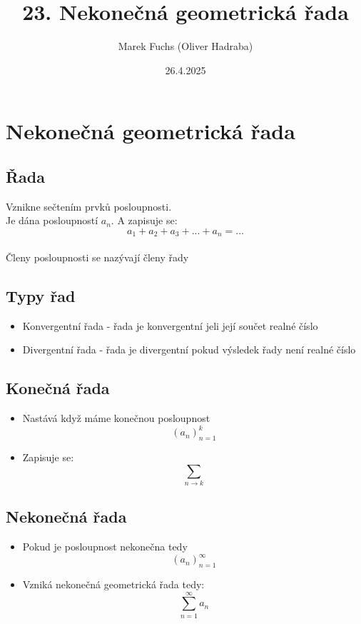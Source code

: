 \title{ 23. Nekonečná geometrická řada}
\author{Marek Fuchs (Oliver Hadraba)}
\date{26.4.2025}

\maketitle



\section{Nekonečná geometrická řada}
    \subsection{Řada}
    Vznikne sečtením prvků posloupnosti.\\
    Je dána posloupností $a_n$. A zapisuje se:
    $$
    a_1+a_2+a_3+...+a_n=...
    $$\\
    Členy posloupnosti se nazývají členy řady
    \subsection{Typy řad}
    \begin{itemize}
        \item Konvergentní řada - řada je konvergentní jeli její součet realné číslo
        \item Divergentní řada - řada je divergentní pokud výsledek řady není realné číslo
    \end{itemize}
    \subsection{Konečná řada}
    \begin{itemize}
        \item Nastává když máme konečnou posloupnost 
        $$
        (a_n)^k _{n=1}
        $$
        \item Zapisuje se: 
        $$
        \sum_{n\rightarrow k}
        $$
    \end{itemize}
    \subsection{Nekonečná řada}
    \begin{itemize}
        \item Pokud je posloupnost nekonečna tedy 
        $$
        (a_n)^\infty_{n=1}
        $$
        \item Vzniká nekonečná geometrická řada tedy: 
        $$
        \sum^\infty_{n=1}a_n
        $$
    \end{itemize}
